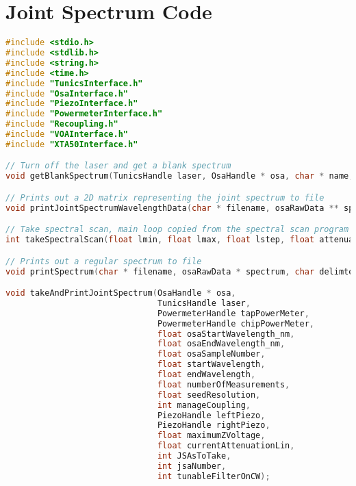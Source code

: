 \newpage
\section{Joint Spectrum Code}
\begin{lstlisting}[style=customc, language=C]
#include <stdio.h>
#include <stdlib.h>
#include <string.h>
#include <time.h>
#include "TunicsInterface.h"
#include "OsaInterface.h"
#include "PiezoInterface.h"
#include "PowermeterInterface.h"
#include "Recoupling.h"
#include "VOAInterface.h"
#include "XTA50Interface.h"

// Turn off the laser and get a blank spectrum
void getBlankSpectrum(TunicsHandle laser, OsaHandle * osa, char * name, int amount);

// Prints out a 2D matrix representing the joint spectrum to file
void printJointSpectrumWavelengthData(char * filename, osaRawData ** spectrum, char delimter, int numberOfSeedReadings);

// Take spectral scan, main loop copied from the spectral scan program
int takeSpectralScan(float lmin, float lmax, float lstep, float attenuation,PowermeterHandle outmeter,PowermeterHandle outmeter2, TunicsHandle laser);

// Prints out a regular spectrum to file
void printSpectrum(char * filename, osaRawData * spectrum, char delimter);

void takeAndPrintJointSpectrum(OsaHandle * osa,
                               TunicsHandle laser,
                               PowermeterHandle tapPowerMeter,
                               PowermeterHandle chipPowerMeter,
                               float osaStartWavelength_nm,
                               float osaEndWavelength_nm,
                               float osaSampleNumber,
                               float startWavelength,
                               float endWavelength,
                               float numberOfMeasurements,
                               float seedResolution,
                               int manageCoupling,
                               PiezoHandle leftPiezo,
                               PiezoHandle rightPiezo,
                               float maximumZVoltage,
                               float currentAttenuationLin,
                               int JSAsToTake,
                               int jsaNumber,
                               int tunableFilterOnCW);


\end{lstlisting}
